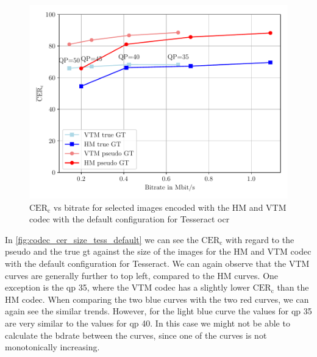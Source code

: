 \begin{figure}[h!]
    \centering
    \includegraphics[width=\textwidth]{../images/analyze/codec_cer_size_tess_default.pdf}
    \caption{$\text{CER}_{\text{c}}$ vs bitrate for selected images encoded with the HM and VTM codec with the default configuration for Tesseract \gls{ocr}}
    \label{fig:codec_cer_size_tess_default}
\end{figure}

In \autoref{fig:codec_cer_size_tess_default} we can see the $\text{CER}_{\text{c}}$ with regard to the pseudo and the true \gls{gt} against the size of the images for the HM and VTM codec with the default configuration for Tesseract.
We can again observe that the VTM curves are generally further to top left, compared to the HM curves.
One exception is the \gls{qp} 35, where the VTM codec has a slightly lower $\text{CER}_{\text{c}}$ than the HM codec.
When comparing the two blue curves with the two red curves, we can again see the similar trends.
However, for the light blue curve the values for \gls{qp} 35 are very similar to the values for \gls{qp} 40.
In this case we might not be able to calculate the \gls{bdrate} between the curves, since one of the curves is not monotonically increasing.


